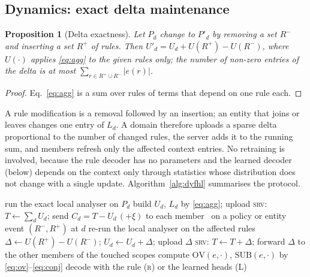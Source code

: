 \documentclass[preprint,12pt]{elsarticle}
\newtheorem{proposition}{Proposition}
\theoremstyle{definition}
\newcommand{\name}{DyFHL-PA\xspace}
\newcommand{\R}{\textsc{r}}
\begin{document}
\subsection{Dynamics: exact delta maintenance}
\label{sec:delta}
\begin{proposition}[Delta exactness]
\label{prop:delta}
Let $P_d$ change to $P'_d$ by removing a set $R^-$ and inserting a set $R^+$ of rules. Then $U'_d=U_d+U(R^+)-U(R^-)$, where $U(\cdot)$ applies \eqref{eq:agg} to the given rules only; the number of non-zero entries of the delta is at most $\sum_{r\in R^+\cup R^-}|e(r)|$.
\end{proposition}
\begin{proof}
Eq.~\eqref{eq:agg} is a sum over rules of terms that depend on one rule each.
\end{proof}
A rule modification is a removal followed by an insertion; an entity that joins or leaves changes one entry of $L_d$. A domain therefore uploads a sparse delta proportional to the number of changed rules, the server adds it to the running sum, and members refresh only the affected context entries. No retraining is involved, because the rule decoder has no parameters and the learned decoder (below) depends on the context only through statistics whose distribution does not change with a single update. Algorithm~\ref{alg:dyfhl} summarises the protocol.

\begin{algorithm}[t]
\caption{\name at domain $d$ (server steps marked \textsc{srv})}
\label{alg:dyfhl}
\begin{algorithmic}[1]
\State run the exact local analyser on $P_d$ 
\State build $U_d$, $L_d$ by \eqref{eq:agg}; upload 
\State \textsc{srv}: $T\gets\sum_{d}U_d$; send $C_d=T-U_d\,(+\xi)$ to each member
\Loop\ on a policy or entity event $(R^-,R^+)$ at $d$
  \State re-run the local analyser on the affected rules
  \State $\Delta\gets U(R^+)-U(R^-)$; $U_d\gets U_d+\Delta$; upload $\Delta$ 
  \State \textsc{srv}: $T\gets T+\Delta$; forward $\Delta$ to the other members of the touched scopes
\EndLoop
{}
  \State compute $\mathrm{OV}(e,\cdot)$, $\mathrm{SUB}(e,\cdot)$ by \eqref{eq:ov}--\eqref{eq:conj}
  \State decode with the rule (\R) or the learned heads (L)
\EndFor
\end{algorithmic}
\end{algorithm}
\end{document}
